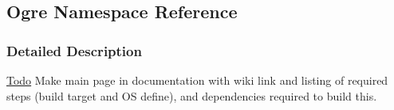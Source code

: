 \hypertarget{namespaceOgre}{
\subsection{Ogre Namespace Reference}
\label{namespaceOgre}
}


\subsubsection{Detailed Description}
\begin{Desc}
\item[\hyperlink{todo__todo000011}{Todo}]Make main page in documentation with wiki link and listing of required steps (build target and OS define), and dependencies required to build this. \end{Desc}
